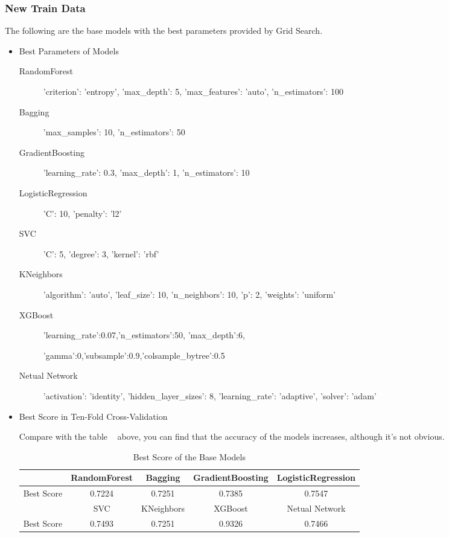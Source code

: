 \subsubsection{New Train Data}
The following are the base models 
with the best parameters 
provided by Grid Search.

\begin{itemize}
	\item Best Parameters of Models
	\begin{description}
		\item[RandomForest] 'criterion': 'entropy', 'max_depth': 5, 
		'max_features': 'auto', 'n_estimators': 100 
		\item[Bagging] 'max_samples': 10, 'n_estimators': 50
		\item[GradientBoosting] 'learning_rate': 0.3, 
		'max_depth': 1, 'n_estimators': 10
		\item[LogisticRegression] 'C': 10, 'penalty': 'l2'
		\item[SVC] 'C': 5, 'degree': 3, 'kernel': 'rbf'
		\item[KNeighbors] 'algorithm': 'auto', 'leaf_size': 10, 
		'n_neighbors': 10, 'p': 2, 'weights': 'uniform' 
		\item[XGBoost] 'learning_rate':0.07,'n_estimators':50,
		'max_depth':6,
		
		'gamma':0,'subsample':0.9,'colsample_bytree':0.5
		\item[Netual Network] 'activation': 'identity', 
		'hidden_layer_sizes': 8, 'learning_rate': 'adaptive', 'solver': 'adam'
	\end{description}
	
	\item Best Score in Ten-Fold Cross-Validation
	
	Compare with the table ~
	above,
	you can find that the accuracy of the models increases,
	although it's not obvious.
	
	\begin{table}[h]  \centering
		\caption{Best Score of the Base Models}
		\label{tbl:best_score_base_models_new}
		\begin{tabular}{ccccc}
			\toprule
			& RandomForest & Bagging & GradientBoosting & 
			LogisticRegression \\
			\midrule
			Best Score & 0.7224 & 0.7251 & 0.7385 & 
			0.7547 \\
			\bottomrule
			\toprule 
			& SVC & KNeighbors & XGBoost & Netual Network\\
			\midrule
			Best Score & 0.7493 & 0.7251 & 0.9326 & 0.7466\\
			\bottomrule
		\end{tabular}
	\end{table}
\end{itemize}


